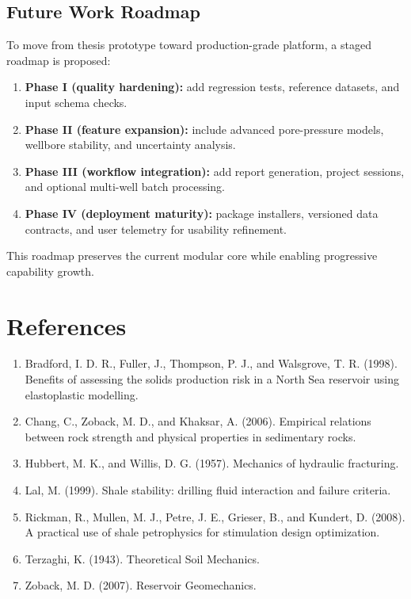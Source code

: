 \documentclass[12pt,a4paper]{report}
\begin{document}
\section{Future Work Roadmap}
To move from thesis prototype toward production-grade platform, a staged roadmap is proposed:
\begin{enumerate}
    \item \textbf{Phase I (quality hardening):} add regression tests, reference datasets, and input schema checks.
    \item \textbf{Phase II (feature expansion):} include advanced pore-pressure models, wellbore stability, and uncertainty analysis.
    \item \textbf{Phase III (workflow integration):} add report generation, project sessions, and optional multi-well batch processing.
    \item \textbf{Phase IV (deployment maturity):} package installers, versioned data contracts, and user telemetry for usability refinement.
\end{enumerate}

This roadmap preserves the current modular core while enabling progressive capability growth.

\chapter*{References}
\begin{enumerate}
    \item Bradford, I. D. R., Fuller, J., Thompson, P. J., and Walsgrove, T. R. (1998). Benefits of assessing the solids production risk in a North Sea reservoir using elastoplastic modelling.
    \item Chang, C., Zoback, M. D., and Khaksar, A. (2006). Empirical relations between rock strength and physical properties in sedimentary rocks.
    \item Hubbert, M. K., and Willis, D. G. (1957). Mechanics of hydraulic fracturing.
    \item Lal, M. (1999). Shale stability: drilling fluid interaction and failure criteria.
    \item Rickman, R., Mullen, M. J., Petre, J. E., Grieser, B., and Kundert, D. (2008). A practical use of shale petrophysics for stimulation design optimization.
    \item Terzaghi, K. (1943). Theoretical Soil Mechanics.
    \item Zoback, M. D. (2007). Reservoir Geomechanics.
\end{enumerate}
\end{document}
